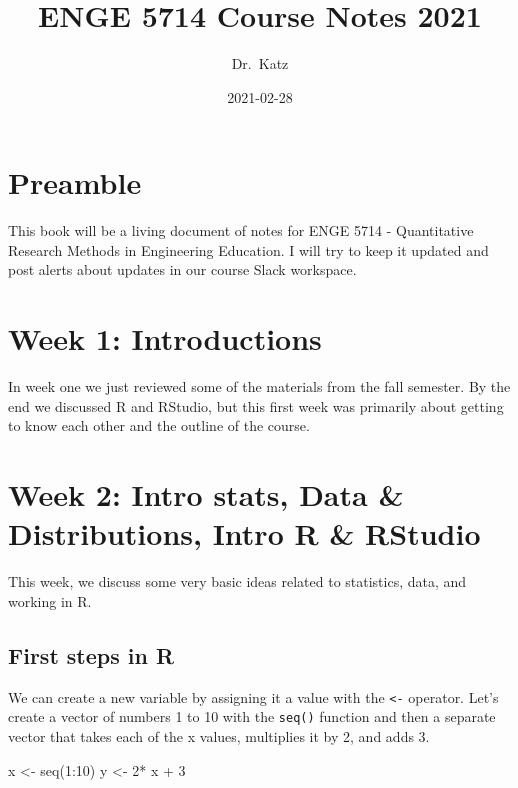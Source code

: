 \documentclass[
]{book}
\title{ENGE 5714 Course Notes 2021}
\author{Dr.~Katz}
\date{2021-02-28}
\newenvironment{Shaded}{\begin{snugshade}}{\end{snugshade}}
\newcommand{\DecValTok}[1]{\textcolor[rgb]{0.00,0.00,0.81}{#1}}
\newcommand{\FunctionTok}[1]{\textcolor[rgb]{0.00,0.00,0.00}{#1}}
\newcommand{\NormalTok}[1]{#1}
\newcommand{\OtherTok}[1]{\textcolor[rgb]{0.56,0.35,0.01}{#1}}
\newcommand{\SpecialCharTok}[1]{\textcolor[rgb]{0.00,0.00,0.00}{#1}}
\begin{document}
\maketitle

{
\setcounter{tocdepth}{1}
\tableofcontents
}
\hypertarget{preamble}{%
\chapter*{Preamble}\label{preamble}}

This book will be a living document of notes for ENGE 5714 - Quantitative Research Methods in Engineering Education. I will try to keep it updated and post alerts about updates in our course Slack workspace.

\hypertarget{week-1-introductions}{%
\chapter{Week 1: Introductions}\label{week-1-introductions}}

In week one we just reviewed some of the materials from the fall semester. By the end we discussed R and RStudio, but this first week was primarily about getting to know each other and the outline of the course.

\hypertarget{week-2-intro-stats-data-distributions-intro-r-rstudio}{%
\chapter{Week 2: Intro stats, Data \& Distributions, Intro R \& RStudio}\label{week-2-intro-stats-data-distributions-intro-r-rstudio}}

This week, we discuss some very basic ideas related to statistics, data, and working in R.

\hypertarget{first-steps-in-r}{%
\section{First steps in R}\label{first-steps-in-r}}

We can create a new variable by assigning it a value with the \texttt{\textless{}-} operator. Let's create a vector of numbers 1 to 10 with the \texttt{seq()} function and then a separate vector that takes each of the x values, multiplies it by 2, and adds 3.

\begin{Shaded}
\begin{Highlighting}[]
\NormalTok{x }\OtherTok{\textless{}{-}} \FunctionTok{seq}\NormalTok{(}\DecValTok{1}\SpecialCharTok{:}\DecValTok{10}\NormalTok{)}
\NormalTok{y }\OtherTok{\textless{}{-}} \DecValTok{2}\SpecialCharTok{*}\NormalTok{ x }\SpecialCharTok{+} \DecValTok{3}
\end{Highlighting}
\end{Shaded}
\end{document}
